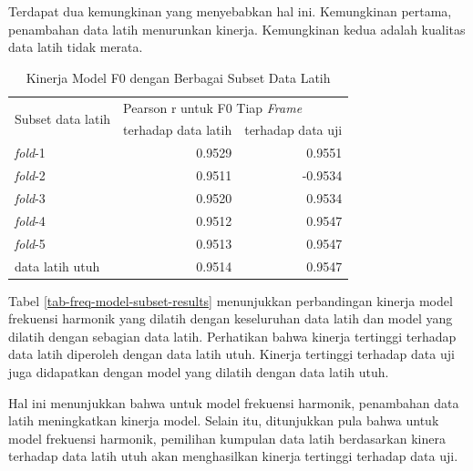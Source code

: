 Terdapat dua kemungkinan yang menyebabkan hal ini. Kemungkinan pertama, penambahan data latih menurunkan kinerja. Kemungkinan kedua adalah kualitas data latih tidak merata.

\begin{table}[htbp]
    \centering
    \caption{Kinerja Model F0 dengan Berbagai Subset Data Latih}\label{tab-f0-model-subset-results}
    \begin{tabular}{ |l|r|r| } 
     \hline
     \multirow{2}{*}{Subset data latih} & \multicolumn{2}{l|}{Pearson r untuk F0 Tiap \textit{Frame}} \\
     \cline{2-3}
     & terhadap data latih & terhadap data uji \\\hline
	\textit{fold}-1          &0.9529  & 0.9551\\\hline
	\textit{fold}-2          &0.9511  &-0.9534\\\hline
	\textit{fold}-3          &0.9520  &0.9534\\\hline
	\textit{fold}-4          &0.9512  &0.9547\\\hline
	\textit{fold}-5          &0.9513  &0.9547\\\hline
	data latih utuh			 &0.9514  &0.9547\\\hline
    \end{tabular}
\end{table}

Tabel \ref{tab-freq-model-subset-results} menunjukkan  perbandingan kinerja model frekuensi harmonik yang dilatih dengan keseluruhan data latih dan model yang dilatih dengan sebagian data latih. Perhatikan bahwa kinerja tertinggi terhadap data latih diperoleh dengan data latih utuh. Kinerja tertinggi terhadap data uji juga didapatkan dengan model yang dilatih dengan data latih utuh. 

Hal ini menunjukkan bahwa untuk model frekuensi harmonik, penambahan data latih meningkatkan kinerja model. Selain itu, ditunjukkan pula bahwa untuk model frekuensi harmonik, pemilihan kumpulan data latih berdasarkan kinera terhadap data latih utuh akan menghasilkan kinerja tertinggi terhadap data uji.

